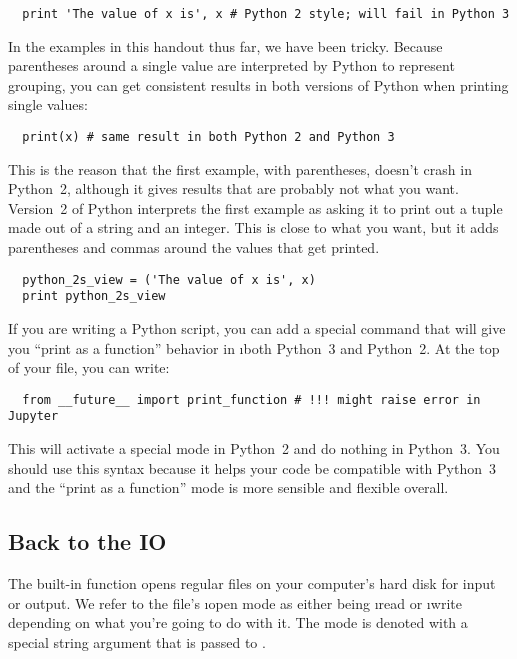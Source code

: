 \documentclass[letterpaper, 12pt, titlepage, twoside]{article}
\begin{document}
\begin{lstlisting}
  print 'The value of x is', x # Python 2 style; will fail in Python 3
\end{lstlisting}

In the examples in this handout thus far, we have been tricky. Because
parentheses around a single value are interpreted by Python to represent
grouping, you can get consistent results in both versions of Python when
printing single values:

\begin{lstlisting}
  print(x) # same result in both Python 2 and Python 3
\end{lstlisting}

This is the reason that the first example, with parentheses, doesn't crash in
Python~2, although it gives results that are probably not what you want.
Version~2 of Python interprets the first example as asking it to print out a
tuple made out of a string and an integer. This is close to what you want, but
it adds parentheses and commas around the values that get printed.

\begin{lstlisting}
  python_2s_view = ('The value of x is', x)
  print python_2s_view
\end{lstlisting}

If you are writing a Python script, you can add a special command that will
give you ``print as a function'' behavior in \i{both} Python~3 and Python~2.
At the top of your file, you can write:

\begin{lstlisting}
  from __future__ import print_function # !!! might raise error in Jupyter
\end{lstlisting}

This will activate a special mode in Python~2 and do nothing in Python~3. You
should use this syntax because it helps your code be compatible with Python~3
and the ``print as a function'' mode is more sensible and flexible overall.

\subsection*{Back to the IO}

The built-in  function opens regular files on your computer's hard
disk for input or output. We refer to the file's \i{open mode} as either being
\i{read} or \i{write} depending on what you're going to do with it. The mode
is denoted with a special string argument that is passed to .
\end{document}
